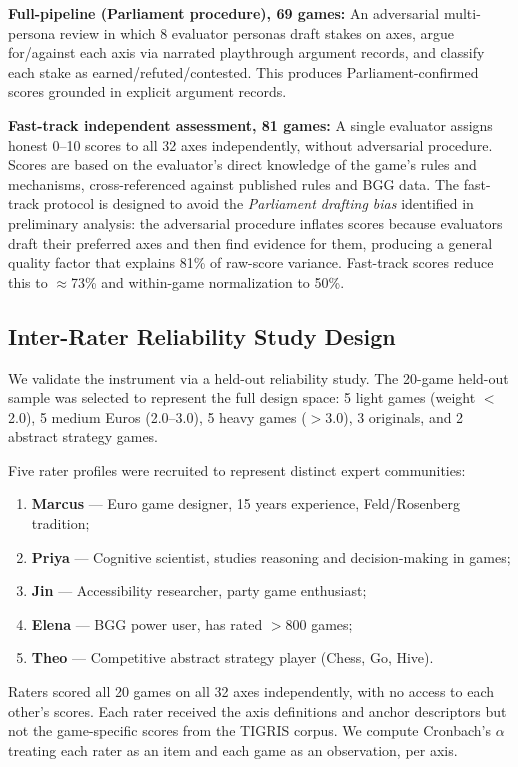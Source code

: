 \textbf{Full-pipeline (Parliament procedure), 69 games:}
An adversarial multi-persona review in which 8 evaluator personas draft stakes on axes,
argue for/against each axis via narrated playthrough argument records, and classify each
stake as earned/refuted/contested. This produces Parliament-confirmed scores grounded in
explicit argument records.

\textbf{Fast-track independent assessment, 81 games:}
A single evaluator assigns honest 0--10 scores to all 32 axes independently,
without adversarial procedure. Scores are based on the evaluator's direct knowledge
of the game's rules and mechanisms, cross-referenced against published rules and BGG data.
The fast-track protocol is designed to avoid the \emph{Parliament drafting bias}
identified in preliminary analysis: the adversarial procedure inflates scores because
evaluators draft their preferred axes and then find evidence for them,
producing a general quality factor that explains 81\% of raw-score variance.
Fast-track scores reduce this to $\approx$73\% and within-game normalization to 50\%.

\subsection{Inter-Rater Reliability Study Design}

We validate the instrument via a held-out reliability study.
The 20-game held-out sample was selected to represent the full design space:
5 light games (weight $<$2.0), 5 medium Euros (2.0--3.0), 5 heavy games ($>$3.0),
3 originals, and 2 abstract strategy games.

Five rater profiles were recruited to represent distinct expert communities:
\begin{enumerate}
  \item \textbf{Marcus} — Euro game designer, 15 years experience, Feld/Rosenberg tradition;
  \item \textbf{Priya} — Cognitive scientist, studies reasoning and decision-making in games;
  \item \textbf{Jin} — Accessibility researcher, party game enthusiast;
  \item \textbf{Elena} — BGG power user, has rated $>$800 games;
  \item \textbf{Theo} — Competitive abstract strategy player (Chess, Go, Hive).
\end{enumerate}

Raters scored all 20 games on all 32 axes independently, with no access to each other's
scores. Each rater received the axis definitions and anchor descriptors but not
the game-specific scores from the TIGRIS corpus.
We compute Cronbach's $\alpha$~\citep{cronbach1951coefficient} treating each rater as an
item and each game as an observation, per axis.
